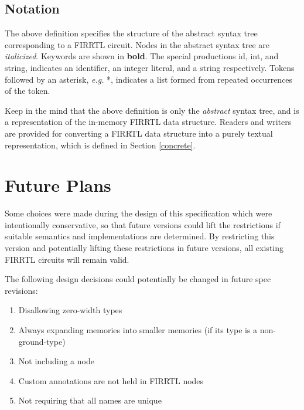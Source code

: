 \documentclass[12pt]{article}
\begin{document}
\subsection{Notation}
The above definition specifies the structure of the abstract syntax tree corresponding to a FIRRTL circuit.
Nodes in the abstract syntax tree are {\em italicized}.
Keywords are shown in {\bf bold}.
The special productions id, int, and string, indicates an identifier, an integer literal, and a string respectively.
Tokens followed by an asterisk, {\em e.g.} *, indicates a list formed from repeated occurrences of the token.

Keep in the mind that the above definition is only the {\em abstract} syntax tree, and is a representation of the in-memory FIRRTL data structure.
Readers and writers are provided for converting a FIRRTL data structure into a purely textual representation, which is defined in Section \ref{concrete}.


\section{Future Plans}
Some choices were made during the design of this specification which were intentionally conservative, so that future versions could lift the restrictions if suitable semantics and implementations are determined.
By restricting this version and potentially lifting these restrictions in future versions, all existing FIRRTL circuits will remain valid.

The following design decisions could potentially be changed in future spec revisions:
\begin{enumerate}[topsep=3pt,itemsep=-0.5ex,partopsep=1ex,parsep=1ex]
\item Disallowing zero-width types
\item Always expanding memories into smaller memories (if its type is a non-ground-type)
\item Not including a  node
\item Custom annotations are not held in FIRRTL nodes
\item Not requiring that all names are unique
\end{enumerate}
\end{document}

